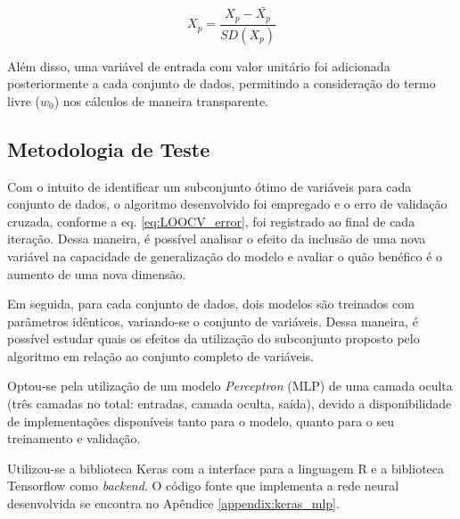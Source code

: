 \begin{equation}
    X_p = \frac{ X_p - \bar{X_p} }{SD(X_p)}
    \label{eq:z-score}
\end{equation}

Além disso, uma variável de entrada com valor unitário foi adicionada posteriormente a cada conjunto de dados, permitindo a consideração do termo livre ($w_0$) nos cálculos de maneira transparente.

\subsection{Metodologia de Teste}

Com o intuito de identificar um subconjunto ótimo de variáveis para cada conjunto de dados, o algoritmo 
desenvolvido foi empregado e o erro de validação cruzada, conforme a eq. \ref{eq:LOOCV_error}, foi registrado ao final de cada iteração. Dessa maneira, é possível analisar o efeito da inclusão de uma nova variável na capacidade de generalização do modelo e avaliar o quão benéfico é o aumento de uma nova dimensão.

Em seguida, para cada conjunto de dados, dois modelos são treinados com parâmetros idênticos, variando-se o conjunto de variáveis. Dessa maneira, é possível estudar quais os efeitos da utilização do subconjunto proposto pelo algoritmo em relação ao conjunto completo de variáveis.

Optou-se pela utilização de um modelo \textit{Perceptron} (MLP) de uma camada oculta (três camadas no total: entradas, camada oculta, saída), devido a disponibilidade de implementações disponíveis tanto para o modelo, quanto para o seu treinamento e validação.

Utilizou-se a biblioteca Keras \cite{keras} com a interface para a linguagem R e a biblioteca Tensorflow \cite{tensorflow} como \textit{backend}. O código fonte que implementa a rede neural desenvolvida se encontra no Apêndice \ref{appendix:keras_mlp}.




